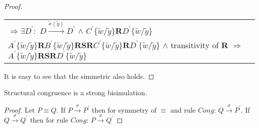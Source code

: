 \begin{proposition}
\begin{proof}
\begin{center}
\begin{tabular}{l}
	$\Rightarrow \exists D^{'}:$ $D \xrightarrow{\tilde{x}(\tilde{y})} D^{'}$ $\wedge$ $C^{'}\{\tilde{w}/\tilde{y}\} \mathbf{R} D^{'}\{\tilde{w}/\tilde{y}\}$
       \\
	$A^{'}\{\tilde{w}/\tilde{y}\} \mathbf{R} B^{'}\{\tilde{w}/\tilde{y}\} \mathbf{R} \mathbf{S} \mathbf{R} C^{'}\{\tilde{w}/\tilde{y}\} \mathbf{R} D^{'}\{\tilde{w}/\tilde{y}\}$ $\wedge$ transitivity of $\mathbf{R}$
	$\Rightarrow$ $A^{'}\{\tilde{w}/\tilde{y}\} \mathbf{R} \mathbf{S} \mathbf{R} D^{'}\{\tilde{w}/\tilde{y}\}$
      \end{tabular}
    \end{center}
    It is easy to see that the simmetric also holds.
   \end{proof}
\end{proposition}

\begin{proposition}
  Structural congruence is a strong bisimulation.
  \begin{proof}
    Let $P\equiv Q$. If $P\xrightarrow{\sigma}P^{'}$ then for symmetry of $\equiv$ and rule $Cong$: $Q\xrightarrow{\sigma}P^{'}$. If $Q\xrightarrow{\sigma}Q^{'}$ then for rule $Cong$: $P\xrightarrow{\sigma}Q^{'}$
  \end{proof}
\end{proposition}


